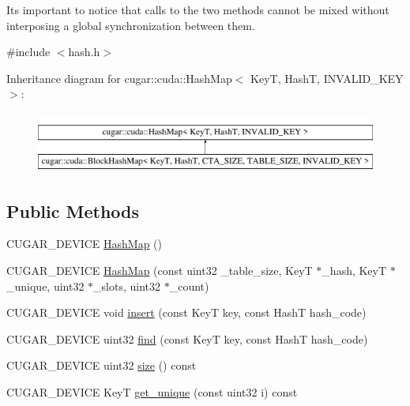 It\textquotesingle{}s important to notice that calls to the two methods cannot be mixed without interposing a global synchronization between them. 

{\ttfamily \#include $<$hash.\+h$>$}

Inheritance diagram for cugar\+:\+:cuda\+:\+:Hash\+Map$<$ KeyT, HashT, I\+N\+V\+A\+L\+I\+D\+\_\+\+K\+EY $>$\+:\begin{figure}[H]
\begin{center}
\leavevmode
\includegraphics[height=2.000000cm]{structcugar_1_1cuda_1_1_hash_map}
\end{center}
\end{figure}
\subsection*{Public Methods}
\begin{DoxyCompactItemize}
\item 
C\+U\+G\+A\+R\+\_\+\+D\+E\+V\+I\+CE \hyperlink{structcugar_1_1cuda_1_1_hash_map_a010078c91599bfd5472498b17a00338f}{Hash\+Map} ()
\item 
C\+U\+G\+A\+R\+\_\+\+D\+E\+V\+I\+CE \hyperlink{structcugar_1_1cuda_1_1_hash_map_ab79e7e37774fe134aa831969c4f0fde4}{Hash\+Map} (const uint32 \+\_\+table\+\_\+size, KeyT $\ast$\+\_\+hash, KeyT $\ast$\+\_\+unique, uint32 $\ast$\+\_\+slots, uint32 $\ast$\+\_\+count)
\item 
C\+U\+G\+A\+R\+\_\+\+D\+E\+V\+I\+CE void \hyperlink{structcugar_1_1cuda_1_1_hash_map_acbef3382463b59782820e26370ed0794}{insert} (const KeyT key, const HashT hash\+\_\+code)
\item 
C\+U\+G\+A\+R\+\_\+\+D\+E\+V\+I\+CE uint32 \hyperlink{structcugar_1_1cuda_1_1_hash_map_a9f8bf3bd7f80e1fc667fe506fbb8979f}{find} (const KeyT key, const HashT hash\+\_\+code)
\item 
C\+U\+G\+A\+R\+\_\+\+D\+E\+V\+I\+CE uint32 \hyperlink{structcugar_1_1cuda_1_1_hash_map_ac36b53b042954823ba4da7bc78f09af5}{size} () const
\item 
C\+U\+G\+A\+R\+\_\+\+D\+E\+V\+I\+CE KeyT \hyperlink{structcugar_1_1cuda_1_1_hash_map_aa76aa5471105fb11566b5915ee96ca46}{get\+\_\+unique} (const uint32 i) const
\end{DoxyCompactItemize}
